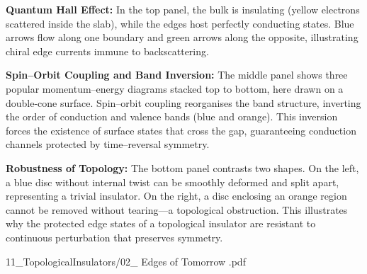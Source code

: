 \begin{SideNotePage}{
  \textbf{Quantum Hall Effect:} In the top panel, the bulk is insulating (yellow electrons scattered inside the slab), while the edges host perfectly conducting states. Blue arrows flow along one boundary and green arrows along the opposite, illustrating chiral edge currents immune to backscattering. \par

  \textbf{Spin–Orbit Coupling and Band Inversion:} The middle panel shows three popular momentum–energy diagrams stacked top to bottom, here drawn on a double-cone surface. Spin–orbit coupling reorganises the band structure, inverting the order of conduction and valence bands (blue and orange). This inversion forces the existence of surface states that cross the gap, guaranteeing conduction channels protected by time–reversal symmetry. \par

  \textbf{Robustness of Topology:} The bottom panel contrasts two shapes. On the left, a blue disc without internal twist can be smoothly deformed and split apart, representing a trivial insulator. On the right, a disc enclosing an orange region cannot be removed without tearing—a topological obstruction. This illustrates why the protected edge states of a topological insulator are resistant to continuous perturbation that preserves symmetry. \par
}{11_TopologicalInsulators/02_ Edges of Tomorrow .pdf}
\end{SideNotePage}
